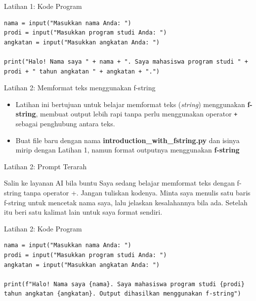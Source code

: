 \documentclass[aspectratio=169, table]{beamer}
\begin{document}
\begin{frame}[fragile]{Latihan 1: Kode Program}
\begin{lstlisting}[style=PythonStyle]
nama = input("Masukkan nama Anda: ")
prodi = input("Masukkan program studi Anda: ")
angkatan = input("Masukkan angkatan Anda: ")

print("Halo! Nama saya " + nama + ". Saya mahasiswa program studi " + prodi + " tahun angkatan " + angkatan + ".")
\end{lstlisting}
\end{frame}

\begin{frame}[fragile]{\LARGE{Latihan 2: Memformat teks menggunakan f-string}}
\begin{itemize}
\item Latihan ini bertujuan untuk belajar memformat teks (\textit{string}) menggunakan \textbf{f-string}, membuat output lebih rapi tanpa perlu menggunakan operator \texttt{+} sebagai penghubung antara teks. 
\item Buat file baru dengan nama \textbf{introduction_with_fstring.py} dan isinya mirip dengan Latihan 1, namun format outputnya menggunakan \textbf{f-string}
\end{itemize}
\end{frame}

\begin{frame}{Latihan 2: Prompt Terarah}
\begin{block}{Salin ke layanan AI bila buntu}
\small Saya sedang belajar memformat teks dengan f-string tanpa operator +. Jangan tuliskan kodenya. Minta saya menulis satu baris f-string untuk mencetak nama saya, lalu jelaskan kesalahannya bila ada. Setelah itu beri satu kalimat lain untuk saya format sendiri.
\end{block}
\end{frame}

\begin{frame}[fragile]{Latihan 2: Kode Program}
\begin{lstlisting}[style=PythonStyle]
nama = input("Masukkan nama Anda: ")
prodi = input("Masukkan program studi Anda: ")
angkatan = input("Masukkan angkatan Anda: ")

print(f"Halo! Nama saya {nama}. Saya mahasiswa program studi {prodi} tahun angkatan {angkatan}. Output dihasilkan menggunakan f-string")
\end{lstlisting}
\end{frame}
\end{document}
